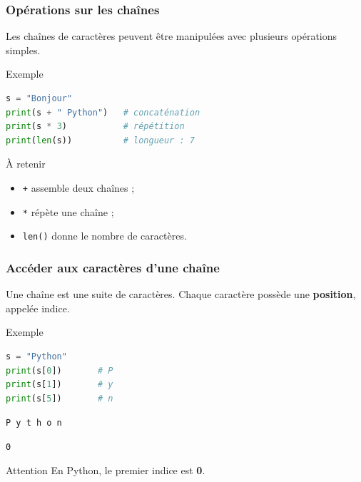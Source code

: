 \documentclass[10pt]{beamer}
\begin{document}
\begin{frame}[containsverbatim]
\frametitle{Opérations sur les chaînes}

Les chaînes de caractères peuvent être manipulées avec plusieurs
opérations simples.

\begin{exampleblock}{Exemple}
\begin{lstlisting}[language=Python]
s = "Bonjour"
print(s + " Python")   # concaténation
print(s * 3)           # répétition
print(len(s))          # longueur : 7
\end{lstlisting}
\end{exampleblock}

\vspace{0.2cm}

\begin{block}{À retenir}
\begin{itemize}
\item \texttt{+} assemble deux chaînes ;
\item \texttt{*} répète une chaîne ;
\item \texttt{len()} donne le nombre de caractères.
\end{itemize}
\end{block}

\end{frame}

\begin{frame}[containsverbatim]
\frametitle{Accéder aux caractères d'une chaîne}

Une chaîne est une suite de caractères.
Chaque caractère possède une \textbf{position}, appelée indice.

\begin{exampleblock}{Exemple}
\begin{lstlisting}[language=Python]
s = "Python"
print(s[0])       # P
print(s[1])       # y
print(s[5])       # n
\end{lstlisting}
\end{exampleblock}

\vspace{0.15cm}

\begin{center}
\texttt{P \;\; y \;\; t \;\; h \;\; o \;\; n}

\vspace{0.1cm}

\texttt{0 \; \; \; \; \;}
\end{center}

\vspace{0.1cm}

\begin{alertblock}{Attention}
En Python, le premier indice est \textbf{0}.
\end{alertblock}

\end{frame}
\end{document}
